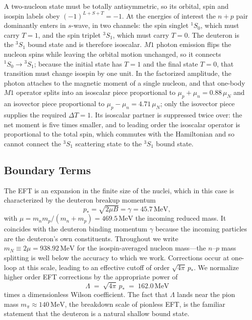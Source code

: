 \documentclass[
  aps,prd,twocolumn,nofootinbib,superscriptaddress,
  longbibliography,floatfix,preprintnumbers
]{revtex4-2}
\newcommand{\muN}{\mu_{N}}
\newcommand{\Mone}{M1}
\newcommand{\pstar}{p_{\ast}}
\begin{document}
A two-nucleon
state must be totally antisymmetric, so its orbital, spin and isospin labels obey
$(-1)^{L+S+T}=-1$. At the energies of interest the $n + p$ pair dominantly enters in $s$-wave,
in two channels: the spin singlet $^{1}S_{0}$, which must carry $T=1$, and the spin
triplet $^{3}S_{1}$, which must carry $T=0$. The deuteron is the $^{3}S_{1}$ bound
state and is therefore isoscalar. $\Mone$ photon emission flips the nucleon spins while
leaving the orbital motion unchanged, so it connects $^{1}S_{0}\!\to\!{}^{3}S_{1}$;
because the initial state has $T=1$ and the final state $T=0$, that transition must
change isospin by one unit. 
In the factorized amplitude, the photon attaches to the magnetic moment of a single nucleon, and that one-body $\Mone$
operator splits into an isoscalar piece proportional to $\mu_{p}+\mu_{n}=0.88\,\muN$ and an isovector piece proportional to $\mu_{p}-\mu_{n}=4.71\,\muN$; only the isovector
piece supplies the required $\Delta T=1$. Its isoscalar partner is suppressed twice
over: the net moment is five times smaller, and to leading order the isoscalar operator is
proportional to the total spin, which commutes with the Hamiltonian and so cannot
connect the $^{3}S_{1}$ scattering state to the $^{3}S_{1}$ bound state.

\subsection{Boundary Terms}
\label{sec:bdy}

The EFT is an expansion in the finite size of the nuclei, which in this case is characterized by the deuteron breakup momentum~\cite{Tait:2026guk}
\begin{equation}
  \pstar=\sqrt{2\mu B}=\gamma=45.7\,\mathrm{MeV},
  \label{eq:pstar}
\end{equation}
with $\mu=m_{n}m_{p}/(m_{n}+m_{p})=469.5\,\mathrm{MeV}$ the incoming reduced mass. It coincides with the deuteron binding momentum $\gamma$ because the
incoming particles are the deuteron's own constituents. Throughout we write
$m_{N}\equiv2\mu=938.92\,\mathrm{MeV}$ for the isospin-averaged nucleon mass---the
$n$--$p$ mass splitting is well below the accuracy to which we work. Corrections occur at
one-loop at this scale, leading to an effective cutoff of order $\sqrt{4\pi}\,\pstar$.
We normalize higher order EFT corrections by the appropriate power of
\begin{equation}
  \Lambda \;=\; \sqrt{4\pi}\,\pstar \;=\; 162.0\,\mathrm{MeV}
  \label{eq:Lambda}
\end{equation}
times a dimensionless Wilson coefficient. The fact that $\Lambda$ lands near the pion mass
$m_{\pi}\approx140\,\mathrm{MeV}$, the breakdown scale of pionless EFT, is the familiar statement that the deuteron is a natural shallow bound state. 
\end{document}
